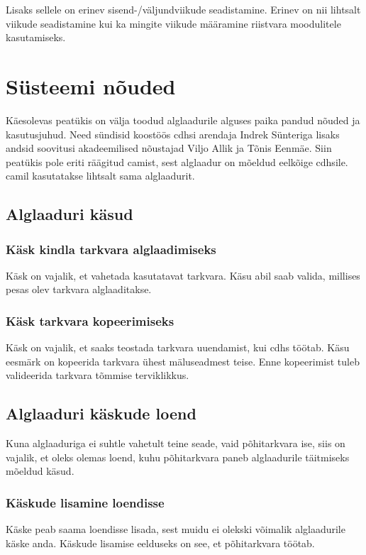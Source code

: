 \documentclass[12pt,a4paper]{article}
\begin{document}
Lisaks sellele on erinev sisend-/väljundviikude seadistamine. Erinev on nii
lihtsalt viikude seadistamine kui ka mingite viikude määramine riistvara
moodulitele kasutamiseks.

\section{Süsteemi nõuded}
Käesolevas peatükis on välja toodud alglaadurile alguses paika pandud nõuded ja
kasutusjuhud. Need sündisid koostöös \gls{cdhs}i arendaja Indrek Sünteriga
lisaks andsid soovitusi akadeemilised nõustajad Viljo Allik ja Tõnis Eenmäe.
Siin peatükis pole eriti räägitud \gls{cam}ist, sest alglaadur on mõeldud
eelkõige \gls{cdhs}ile. \Gls{cam}il kasutatakse lihtsalt sama alglaadurit.

\subsection{Alglaaduri käsud}
\subsubsection{Käsk kindla tarkvara alglaadimiseks}
Käsk on vajalik, et vahetada kasutatavat tarkvara. Käsu abil saab valida,
millises pesas olev tarkvara alglaaditakse.

\subsubsection{Käsk tarkvara kopeerimiseks}
Käsk on vajalik, et saaks teostada tarkvara uuendamist, kui \gls{cdhs} töötab. Käsu
eesmärk on kopeerida tarkvara ühest mäluseadmest teise. Enne kopeerimist tuleb
valideerida tarkvara tõmmise terviklikkus.

\subsection{Alglaaduri käskude loend}
Kuna alglaaduriga ei suhtle vahetult teine seade, vaid põhitarkvara ise, siis on
vajalik, et oleks olemas loend, kuhu põhitarkvara paneb alglaadurile täitmiseks
mõeldud käsud.
\subsubsection{Käskude lisamine loendisse}
Käske peab saama loendisse lisada, sest muidu ei olekski võimalik alglaadurile
käske anda. Käskude lisamise eelduseks on see, et põhitarkvara töötab.
\end{document}
